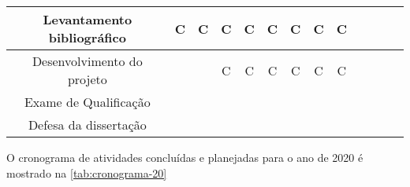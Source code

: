 \begin{table}[htb]
{\begin{tabular}{|c|c|c|c|c|c|c|c|c|c|c|c|c|}
			\hline
			Levantamento bibliográfico
			& \cellcolor[HTML]{9AFF99}C
			& \cellcolor[HTML]{9AFF99}C
			& \cellcolor[HTML]{9AFF99}C
			& \cellcolor[HTML]{9AFF99}C
			& \cellcolor[HTML]{9AFF99}C
			& \cellcolor[HTML]{9AFF99}C
			& \cellcolor[HTML]{9AFF99}C
			& \cellcolor[HTML]{9AFF99}C \\
			
			\hline
			Desenvolvimento do projeto
			&
			&
			& \cellcolor[HTML]{9AFF99}C
			& \cellcolor[HTML]{9AFF99}C
			& \cellcolor[HTML]{9AFF99}C
			& \cellcolor[HTML]{9AFF99}C
			& \cellcolor[HTML]{9AFF99}C
			& \cellcolor[HTML]{9AFF99}C \\ 
			
			\hline
			Exame de Qualificação
			&
			&
			&
			&
			&
			&
			&
			& \\
			
			\hline
			Defesa da dissertação
			&
			&
			&
			&
			&
			&
			&
			& \\
			\hline
			
		\end{tabular}}
	\end{table}

	O cronograma de atividades concluídas e planejadas para o ano de 2020 é mostrado na \autoref{tab:cronograma-20}

